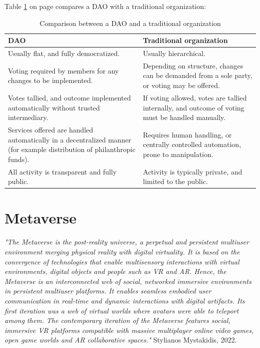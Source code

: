 \documentclass[MSE,Master,english]{twbook}%
\begin{document}
Table \ref{table:DAOComparison} on page \pageref{table:DAOComparison} compares a DAO with a traditional organization:
\begin{center}
  \begin{table}[H]
    \begin{tabular}{ | m{20em} | m{20em} | }
      \hline
      \textbf{DAO} & \textbf{Traditional organization} \\ 
      \hline
      Usually flat, and fully democratized. & Usually hierarchical. \\
      \hline  
      Voting required by members for any changes to be implemented. & Depending on structure, changes can be demanded from a sole party, or voting may be offered. \\
      \hline
      Votes tallied, and outcome implemented automatically without trusted intermediary. & If voting allowed, votes are tallied internally, and outcome of voting must be handled manually. \\
      \hline
      Services offered are handled automatically in a decentralized manner (for example distribution of philanthropic funds). & Requires human handling, or centrally controlled automation, prone to manipulation. \\
      \hline
      All activity is transparent and fully public. & Activity is typically private, and limited to the public. \\
      \hline
    \end{tabular}
    \caption{Comparison between a DAO and a traditional organization \cite{DAO}}
    \label{table:DAOComparison}
  \end{table}
\end{center}

\section{Metaverse\label{dcl}}
\emph{"The Metaverse is the post-reality universe, a perpetual and persistent multiuser environment merging physical reality with digital virtuality. It is based on the convergence of technologies that enable multisensory interactions with virtual environments, digital objects and people such as \ac{VR} and \ac{AR}. Hence, the Metaverse is an interconnected web of social, networked immersive environments in persistent multiuser platforms. It enables seamless embodied user communication in real-time and dynamic interactions with digital artifacts. Its first iteration was a web of virtual worlds where avatars were able to teleport among them. The contemporary iteration of the Metaverse features social, immersive VR platforms compatible with massive multiplayer online video games, open game worlds and AR collaborative spaces."} Stylianos Mystakidis, 2022. \cite{metaverse} \\
\end{document}
